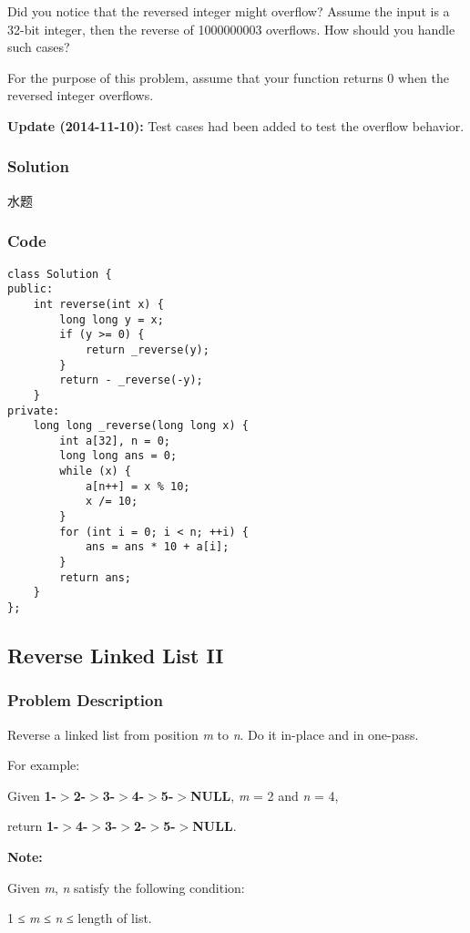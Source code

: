 \documentclass[courier]{article}
\begin{document}
\begin{CJK*}{UTF8}{gkai}
Did you notice that the reversed integer might overflow? Assume the input is a 32-bit integer, then the reverse of 1000000003 overflows. How should you handle such cases?

For the purpose of this problem, assume that your function returns 0 when the reversed integer overflows.

\textbf{Update (2014-11-10):}
Test cases had been added to test the overflow behavior.



\subsubsection*{Solution}
水题

\subsubsection*{Code}
\begin{lstlisting}
class Solution {
public:
    int reverse(int x) {
        long long y = x;
        if (y >= 0) {
            return _reverse(y);
        }
        return - _reverse(-y);
    }
private:
    long long _reverse(long long x) {
        int a[32], n = 0;
        long long ans = 0;
        while (x) {
            a[n++] = x % 10;
            x /= 10;
        }
        for (int i = 0; i < n; ++i) {
            ans = ans * 10 + a[i];
        }
        return ans;
    }
}; 
\end{lstlisting}


\subsection{ Reverse Linked List II }

\subsubsection*{Problem Description}
Reverse a linked list from position \emph{m} to \emph{n}. Do it in-place and in one-pass.

For example:


Given \textbf{1-$>$2-$>$3-$>$4-$>$5-$>$NULL}, \emph{m} = 2 and \emph{n} = 4,

return \textbf{1-$>$4-$>$3-$>$2-$>$5-$>$NULL}.

\textbf{Note:}


Given \emph{m}, \emph{n} satisfy the following condition:


1 ≤ \emph{m} ≤ \emph{n} ≤ length of list.




\end{CJK*}
\end{document}
